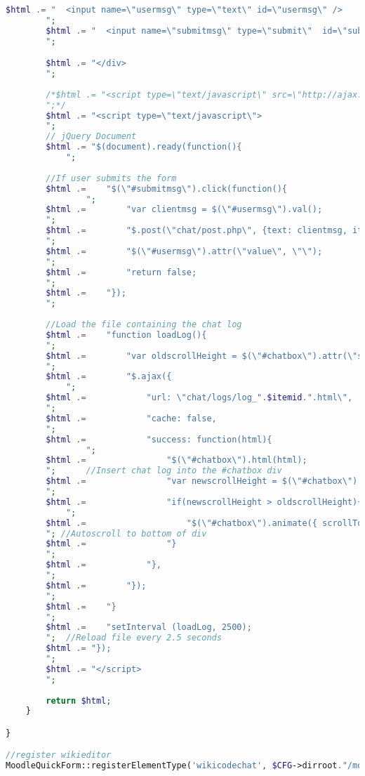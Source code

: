 \begin{lstlisting}[language=PHP]
		$html .= "	<input name=\"usermsg\" type=\"text\" id=\"usermsg\" />
		";
		$html .= "	<input name=\"submitmsg\" type=\"submit\"  id=\"submitmsg\" value=\"Send\" />
		";

  		$html .= "</div>
  		";
		
  		/*$html .= "<script type=\"text/javascript\" src=\"http://ajax.googleapis.com/ajax/libs/jquery/1.3/jquery.min.js\"></script>
  		";*/
  		$html .= "<script type=\"text/javascript\">
  		";
		// jQuery Document
  		$html .= "$(document).ready(function(){
  			";
		
		//If user submits the form
  		$html .= 	"$(\"#submitmsg\").click(function(){
  				";
  		$html .= 		"var clientmsg = $(\"#usermsg\").val();
  		";
  		$html .= 		"$.post(\"chat/post.php\", {text: clientmsg, itemid: \"".$itemid."\", user: \"".$USER->username."\"});
  		";				
  		$html .= 		"$(\"#usermsg\").attr(\"value\", \"\");
  		";
  		$html .= 		"return false;
  		";
  		$html .= 	"});
  		";
	
		//Load the file containing the chat log
  		$html .= 	"function loadLog(){
  		";
  		$html .= 		"var oldscrollHeight = $(\"#chatbox\").attr(\"scrollHeight\") - 20;
  		";
  		$html .= 		"$.ajax({
  			";
  		$html .= 			"url: \"chat/logs/log_".$itemid.".html\",
  		";
  		$html .= 			"cache: false,
  		";
  		$html .= 			"success: function(html){
  				";	
  		$html .= 				"$(\"#chatbox\").html(html); 		
  		";		//Insert chat log into the #chatbox div
  		$html .= 				"var newscrollHeight = $(\"#chatbox\").attr(\"scrollHeight\") - 20;
  		";
  		$html .= 				"if(newscrollHeight > oldscrollHeight){
  			";
  		$html .= 					"$(\"#chatbox\").animate({ scrollTop: newscrollHeight }, 'normal'); 
  		"; //Autoscroll to bottom of div
  		$html .= 				"}
  		";				
  		$html .= 		  	"},
  		";
  		$html .= 		"});
  		";
  		$html .= 	"}
  		";
  		$html .= 	"setInterval (loadLog, 2500);
  		";	//Reload file every 2.5 seconds
  		$html .= "});
  		";
  		$html .= "</script>
  		";  
			
		return $html;
    }

}

//register wikieditor
MoodleQuickForm::registerElementType('wikicodechat', $CFG->dirroot."/mod/wikicode/editors/wikichat.php", 'MoodleQuickForm_Wikichat');
\end{lstlisting}

